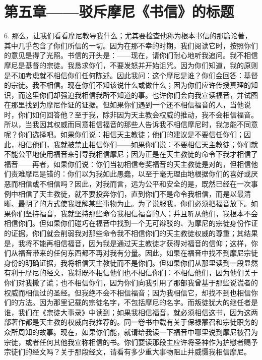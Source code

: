 
\section{第五章——驳斥摩尼《书信》的标题}

6. 那么，让我们看看摩尼教导我什么；尤其要检查他称为根本书信的那篇论著，其中几乎包含了你们所信的一切。因为在那不幸的时期，我们阅读它时，按照你们的意见是得了光照。书信的开头是：——现在，请你们耐心地听我追问。我不相信摩尼是基督的宗徒。我恳求你们，不要发怒并开始诅咒。因为你们知道，我的原则是不加考虑就不相信你们任何陈述。因此我问：这个摩尼是谁？你们会回答：基督的宗徒。我不相信。现在你们不知该说什么或做什么；因为你们应许传授真理的知识，而这里你们却强迫我相信我所不知道的事。也许你们会向我宣读福音，并试图在那里找到为摩尼作证的证据。但如果你们遇到一个还不相信福音的人，当他说时，你们如何回答他？至于我，除非因为天主教会权威的推动，我不会相信福音。所以，当我因其权威而同意相信福音的那些人告诉我不相信摩尼时，我怎能不同意呢？你们选择吧。如果你们说：相信天主教徒；他们的建议是不要信任你们；因此，相信他们，我就被禁止相信你们——如果你们说：不要相信天主教徒；你们就不能公平地使用福音来引导我相信摩尼；因为正是在天主教徒的命令下我才相信了福音——再者，如果你们说：你们当初相信夸奖福音的天主教徒是对的，但相信他们责难摩尼是错的：你们以为我如此愚蠢，以至于毫无理由地根据你们的喜好或厌恶而相信或不相信吗？因此，对我而言，远为公平和安全的是，既然已经在一次事例中相信了天主教徒，就不要投奔你们，直到你们不是命令我相信，而是以最清晰、最明了的方式使我理解某些事物为止。为了说服我，你们必须把福音放下。如果你们坚持福音，我就坚持那些命令我相信福音的人；并且听从他们，我根本不会相信你们。但如果你们碰巧在福音中找到一个无可辩驳的、为摩尼的宗徒身份作证的证据，你们就会削弱我对那些命令我不相信你们的天主教徒权威的尊重；其结果是，我将不能再相信福音，因为我是通过天主教徒才获得对福音的信仰；这样，你们从福音带来的任何东西都不再对我有分量。因此，如果在福音中找不到摩尼宗徒身份的明确证据，我将相信天主教徒而不是你们。但如果你们从那里读到一段显然有利于摩尼的经文，我将既不相信他们也不相信你们：不相信他们，因为他们关于你们对我撒了谎；也不相信你们，因为你们向我引用了那部我曾基于那些说谎者的权威而相信过的圣经。但我绝不会不相信福音；因为我相信它，却找不到也相信你们的方法。因为那里记载的宗徒名字，不包括摩尼的名字。而叛徒犹大的继任者是谁，我们在《宗徒大事录》中读到；如果我相信福音，就必须相信这书，因为这两部著作都是天主教的权威向我推荐的。同一卷书中载有关于保禄蒙召和宗徒职务的众所周知的故事。现在，如果你们能，就请给我读一下福音中哪里说到摩尼被召为宗徒，或者任何其他我宣称相信的书。你们要读那段主应许将圣神作为护慰者赐予宗徒们的经文吗？关于那段经文，请看有多少重大事物阻止并威慑我相信摩尼。\par

